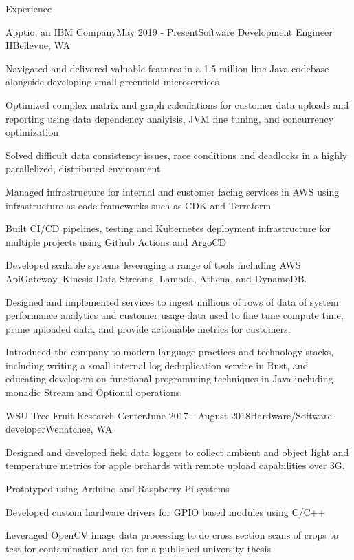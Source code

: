\documentclass[
	11pt, %
]{resume} %
\begin{document}
\begin{rSection}{Experience}

   \begin{rSubsection}{Apptio, an IBM Company}{May 2019 - Present}{Software Development Engineer II}{Bellevue, WA}
        \item Navigated and delivered valuable features in a 1.5 million line Java codebase alongside developing small greenfield microservices
        \item Optimized complex matrix and graph calculations for customer data uploads and reporting using data dependency analyisis, JVM fine tuning, and concurrency optimization
        \item Solved difficult data consistency issues, race conditions and deadlocks in a highly parallelized, distributed environment
        \item Managed infrastructure for internal and customer facing services in AWS using infrastructure as code frameworks such as CDK and Terraform
        \item Built CI/CD pipelines, testing and Kubernetes deployment infrastructure for multiple projects using Github Actions and ArgoCD
        \item Developed scalable systems leveraging a range of tools including AWS ApiGateway, Kinesis Data Streams, Lambda, Athena, and DynamoDB.
        \item Designed and implemented services to ingest millions of rows of data of system performance analytics and customer usage data used to fine tune compute time, prune uploaded data, and provide actionable metrics for customers. 
        \item Introduced the company to modern language practices and technology stacks, including writing a small internal log deduplication service in Rust, and educating developers on functional programming techniques in Java including monadic Stream and Optional operations.
    \end{rSubsection}

    \begin{rSubsection}{WSU Tree Fruit Research Center}{June 2017 - August 2018}{Hardware/Software developer}{Wenatchee, WA}
        \item Designed and developed field data loggers to collect ambient and object light and temperature metrics for apple orchards with remote upload capabilities over 3G.
        \item Prototyped using Arduino and Raspberry Pi systems
        \item Developed custom hardware drivers for GPIO based modules using C/C++
        \item Leveraged OpenCV image data processing to do cross section scans of crops to test for contamination and rot for a published university thesis
    \end{rSubsection}

\end{rSection}
\end{document}
